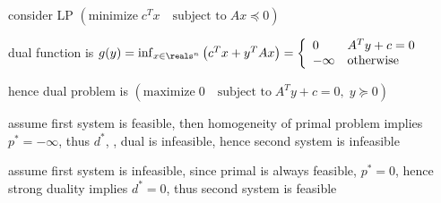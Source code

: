 \documentclass[17pt,landscape]{foils}
\begin{document}
{\vitem
	consider LP
	$\left(\mbox{minimize}\; c^T x \quad \mbox{subject to}\; Ax \preceq 0\right)$

\vitem
	dual function is
	$
		g(y)
			=
		\inf_{x\in\reals^n} \left(c^Tx + y^TAx \right)
			=
		\left\{
		\begin{array}{ll}
			0 & A^Ty + c= 0
			\\
			-\infty & \mbox{otherwise}
		\end{array}
		\right.
	$

\vitem
	hence dual problem is
	$
	\left(
			\mbox{maximize}
			\;
				0
			\quad
			\mbox{subject to}
			\;
				A^T y + c = 0%
			,
			\;
				y \succeq 0
	\right)
	$

\vitem
	assume first system is feasible,
	then homogeneity of primal problem implies $p^\ast = -\infty$,
	thus $d^\ast$, \ie, dual is infeasible,
	hence second system is infeasible

\vitem
	assume first system is infeasible,
	since primal is always feasible,
	$p^\ast=0$,
	hence strong duality implies $d^\ast =0$,
	thus second system is feasible
\eit
\vfill



\newcommand{\bigpropercone}{\ensuremath{\mathcalfont{K}}}


}
\end{document}
